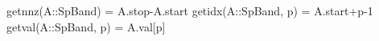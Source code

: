 \begin{juliacode} 
getnnz(A::SpBand) = A.stop-A.start
getidx(A::SpBand, p) = A.start+p-1
getval(A::SpBand, p) = A.val[p]
\end{juliacode}